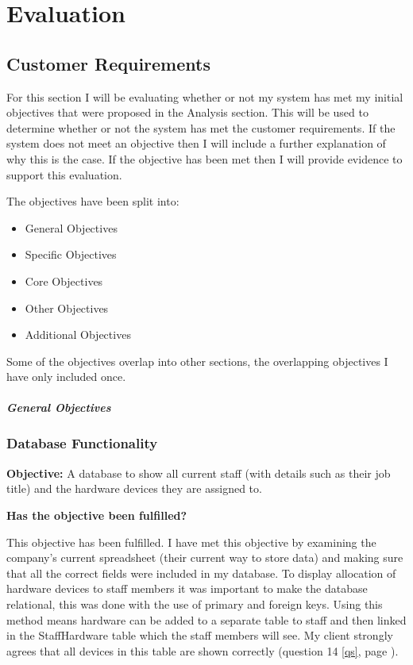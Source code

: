 \chapter{Evaluation}

\section{Customer Requirements}

For this section I will be evaluating whether or not my system has met my initial objectives that were proposed in the Analysis section. This will be used to determine whether or not the system has met the customer requirements. If the system does not meet an objective then I will include a further explanation of why this is the case. If the objective has been met then I will provide evidence to support this evaluation.

The objectives have been split into:
\begin{itemize}
\item{General Objectives}
\item{Specific Objectives}
\item{Core Objectives}
\item{Other Objectives}
\item{Additional Objectives}
\end{itemize}

Some of the objectives overlap into other sections, the overlapping objectives I have only included once.

\paragraph{General Objectives}

\subsection{Database Functionality}\label{staffhardware}

\textbf{Objective:} A database to show all current staff (with details such as their job title) and the hardware devices they are assigned to.

\textbf{Has the objective been fulfilled?}

This objective has been fulfilled. I have met this objective by examining the company's current spreadsheet (their current way to store data) and making sure that all the correct fields were included in my database. To display allocation of hardware devices to staff members it was important to make the database relational, this was done with the use of primary and foreign keys. Using this method means hardware can be added to a separate table to staff and then linked in the StaffHardware table which the staff members will see. My client strongly agrees that all devices in this table are shown correctly (question 14 \ref{qs}, page \pageref{qs}).

